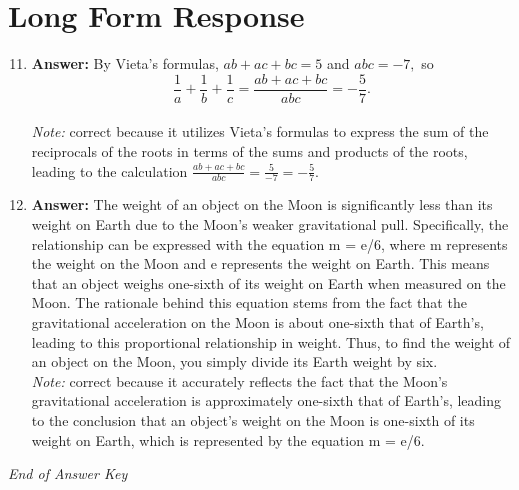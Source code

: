 \documentclass[12pt]{article}
\begin{document}
\section*{Long Form Response}
\begin{enumerate}[label=\arabic*.]
\setcounter{enumi}{10}
\item \textbf{Answer:} By Vieta's formulas, $ab + ac + bc = 5$ and $abc = -7,$ so \[\frac{1}{a} + \frac{1}{b} + \frac{1}{c} = \frac{ab + ac + bc}{abc} = \boxed{-\frac{5}{7}}.\]
\\ \textit{Note:} correct because it utilizes Vieta's formulas to express the sum of the reciprocals of the roots in terms of the sums and products of the roots, leading to the calculation \(\frac{ab + ac + bc}{abc} = \frac{5}{-7} = -\frac{5}{7}\).
\item \textbf{Answer:} The weight of an object on the Moon is significantly less than its weight on Earth due to the Moon's weaker gravitational pull. Specifically, the relationship can be expressed with the equation m = e/6, where m represents the weight on the Moon and e represents the weight on Earth. This means that an object weighs one-sixth of its weight on Earth when measured on the Moon. The rationale behind this equation stems from the fact that the gravitational acceleration on the Moon is about one-sixth that of Earth's, leading to this proportional relationship in weight. Thus, to find the weight of an object on the Moon, you simply divide its Earth weight by six.
\\ \textit{Note:} correct because it accurately reflects the fact that the Moon's gravitational acceleration is approximately one-sixth that of Earth's, leading to the conclusion that an object's weight on the Moon is one-sixth of its weight on Earth, which is represented by the equation m = e/6.
\end{enumerate}

\vfill
\noindent\textit{End of Answer Key}
\end{document}
